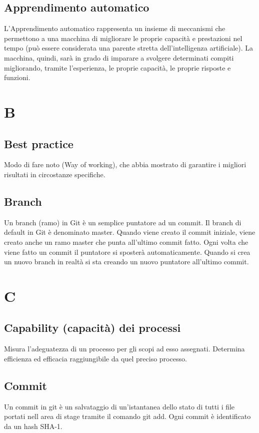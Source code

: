 	\subsection{Apprendimento automatico}
	
	L'Apprendimento automatico rappresenta un insieme di meccanismi che permettono a una macchina di migliorare le proprie capacità e prestazioni nel tempo (può essere considerata una parente stretta dell’intelligenza artificiale). La macchina, quindi, sarà in grado di imparare a svolgere determinati compiti migliorando, tramite l’esperienza, le proprie capacità, le proprie risposte e funzioni. 
	
	\section{B}
	
	\subsection{Best practice} 
	Modo di fare noto (Way of working), che abbia mostrato di garantire i migliori risultati in circostanze specifiche.
	
	\subsection{Branch} 
	Un branch (ramo) in Git è un semplice puntatore ad un commit. Il branch di default in Git è denominato master. Quando viene creato il commit iniziale, viene creato anche un ramo master che punta all'ultimo commit fatto. Ogni volta che viene fatto un commit il puntatore si sposterà automaticamente. Quando si crea un nuovo branch in realtà si sta creando un nuovo puntatore all'ultimo commit.
	
	\section{C}
	
	\subsection{Capability (capacità) dei processi}
	
	Misura l'adeguatezza di un processo per gli scopi ad esso assegnati. Determina efficienza ed efficacia raggiungibile da quel preciso processo.
	\subsection{Commit}
	Un commit in git è un salvataggio di un'istantanea dello stato di tutti i file portati nell area di stage tramite il comando git add. Ogni commit è identificato da un hash SHA-1.
	
